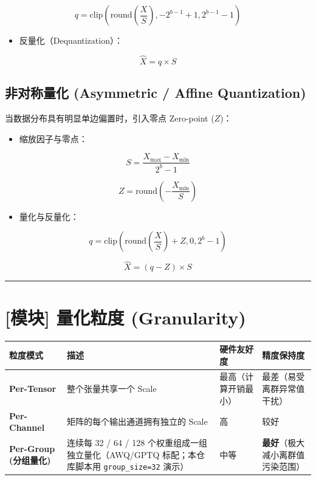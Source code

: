 \[
q = \text{clip}\left(\text{round}\left(\frac{X}{S}\right), -2^{b-1}+1, 2^{b-1}-1\right)
\]

\begin{itemize}
  \item 反量化（Dequantization）：
\end{itemize}

\[
\hat{X} = q \times S
\]

\subsection{非对称量化 (Asymmetric / Affine Quantization)}

当数据分布具有明显单边偏置时，引入零点 Zero-point ($Z$)：
\begin{itemize}
  \item 缩放因子与零点：
\end{itemize}

\[
S = \frac{X_{\max} - X_{\min}}{2^b - 1}
\]

\[
Z = \text{round}\left(-\frac{X_{\min}}{S}\right)
\]

\begin{itemize}
  \item 量化与反量化：
\end{itemize}

\[
q = \text{clip}\left(\text{round}\left(\frac{X}{S}\right) + Z, 0, 2^b - 1\right)
\]

\[
\hat{X} = (q - Z) \times S
\]

\vspace{0.8em}\hrule\vspace{0.8em}

\section{[模块] 量化粒度 (Granularity)}

\begin{center}
\small
\begin{tabularx}{\textwidth}{p{2.5cm} p{3.5cm} X X}
\toprule
\textbf{粒度模式} & \textbf{描述} & \textbf{硬件友好度} & \textbf{精度保持度} \\
\midrule
\textbf{Per-Tensor} & 整个张量共享一个 Scale & 最高（计算开销最小） & 最差（易受离群异常值干扰） \\
\textbf{Per-Channel} & 矩阵的每个输出通道拥有独立的 Scale & 高 & 较好 \\
\textbf{Per-Group (分组量化)} & 连续每 32 / 64 / 128 个权重组成一组独立量化（AWQ/GPTQ 标配；本仓库脚本用 \texttt{group\_size=32} 演示） & 中等 & \textbf{最好}（极大减小离群值污染范围） \\
\bottomrule
\end{tabularx}
\end{center}

